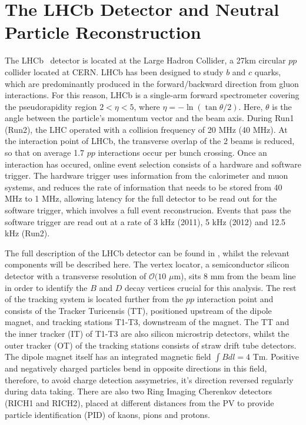 \documentclass[oneside,12pt]{article}
\begin{document}
\section{The LHCb Detector and Neutral Particle Reconstruction} \label{detector}
The LHCb~\cite{LHCbDetector} detector is located at the Large Hadron Collider, a
27km circular $pp$ collider located at CERN. LHCb has been designed to study $b$
and $c$ quarks, which are predominantly produced in the forward/backward
direction from gluon interactions. For this reason, LHCb is a single-arm forward
spectrometer covering the pseudorapidity region $2 < \eta < 5$, where $\eta =
-\ln (\tan \theta / 2)$. Here, $\theta$ is the angle between the particle's
momentum vector and the beam axis. During Run1 (Run2), the LHC operated with a
collision frequency of 20 MHz (40 MHz). At the interaction point of LHCb, the
transverse overlap of the 2 beams is reduced, so that on average 1.7 $pp$
interactions occur per bunch crossing.  Once an interaction has occured, online
event selection consists of a hardware and software trigger. The hardware
trigger uses information from the calorimeter and muon systems, and reduces the
rate of information that needs to be stored from 40 MHz to 1 MHz, allowing
latency for the full detector to be read out for the software trigger, which
involves a full event reconstrucion. Events that pass the software trigger are
read out at a rate of 3 kHz (2011), 5 kHz (2012) and 12.5 kHz (Run2).

The full description of the LHCb detector can be found in \cite{LHCbDetector},
whilst the relevant components will be described here.  The vertex locator, a
semiconductor silicon detector with a transverse resolution of $\mathcal{O}(10$
$\mu$m), sits $8$ mm from the beam line in order to identify the $B$ and $D$
decay vertices crucial for this analysis. The rest of the tracking system is
located further from the $pp$ interaction point and consists of the Tracker
Turicensis (TT), positioned upstream of the dipole magnet, and tracking stations
T1-T3, downstream of the magnet. The TT and the inner tracker (IT) of T1-T3 are
also silicon microstrip detectors, whilst the outer tracker (OT) of the tracking
stations consists of straw drift tube detectors. The dipole magnet itself has an
integrated magnetic field $\int B dl = 4$ Tm.  Positive and negatively charged
particles bend in opposite directions in this field, therefore, to avoid charge
detection assymetries, it's direction reversed regularly during data taking.
There are also two Ring Imaging Cherenkov detectors (RICH1 and RICH2), placed at
different distances from the PV to provide particle identification (PID) of
kaons, pions and protons. 
\end{document}
